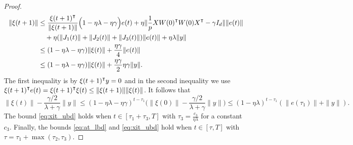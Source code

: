 \begin{proof}
\begin{equation*}
\begin{aligned}
\|\xi(t+1)\|
&\leq \frac{\xi(t+1)\transpose}{\|\xi(t+1)\|}\Big(1-\eta\lambda-\eta\gamma\Big)e(t) + \eta\|\frac{1}{p}XW(0)\transpose W(0)X\transpose-\gamma I_d\|\|e(t)\|\\
&\quad+\eta(\|J_1(t)\|+\|J_2(t)\|+\|J_3(t)\|)\|e(t)\| +\eta\lambda\|y\|  \\
&\leq (1-\eta\lambda-\eta\gamma)\|\xi(t)\|+ \frac{\eta\gamma}{4}\|e(t)\| \\
&\leq (1-\eta\lambda-\eta\gamma)\|\xi(t)\|+ \frac{\eta\gamma}{2}\eta\gamma\|y\|.
\end{aligned}
\end{equation*}
The first inequality is by $\xi(t+1)\transpose y =0$ and in the second inequality we use $\xi(t+1)\transpose e(t) = \xi(t+1)\transpose\xi(t) \leq \|\xi(t+1)\|\|\xi(t)\|$. It follows that
\begin{equation*}
\|\xi(t)\|-\frac{\gamma/2}{\lambda+\gamma}\|y\|\leq (1-\eta\lambda-\eta\gamma)^{t-\tau_1}\Big(\|\xi(0)\|-\frac{\gamma/2}{\lambda+\gamma}\|y\|\Big)\leq (1-\eta\lambda)^{t-\tau_1}(\|e(\tau_1)\|+\|y\|).
\end{equation*}
The bound \eqref{eq:xit_ubd} holds when $t\in [\tau_1+\tau_3,T]$ with $\tau_3 = \frac{c_3}{\eta\lambda}$ for a constant $c_3$. Finally, the bounds \eqref{eq:at_lbd} and \eqref{eq:xit_ubd} hold when $t\in[\tau,T]$ with $\tau = \tau_1 + \max(\tau_2,\tau_3)$.
\end{proof}


